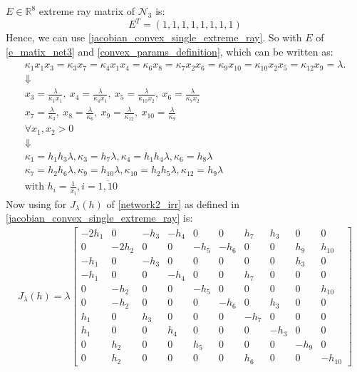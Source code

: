 $E \in \mathbb{R}^8$ extreme ray matrix of $\mathcal{N}_3$ is:
\begin{equation}\label{e_matix_net3}
	E^T=(1,1,1,1,1,1,1,1)
\end{equation}
Hence, we can use \ref{jacobian_convex_single_extreme_ray}. So with $E$ of \ref{e_matix_net3} and \ref{convex_params_definition}, which can be written as:
\begin{gather*}
	\kappa_1x_1x_3=\kappa_3x_7=\kappa_4x_1x_4=\kappa_6x_8=\kappa_7x_2x_6=\kappa_9x_{10}=\kappa_{10}x_2x_5=\kappa_{12}x_9=\lambda. \\
	\Downarrow \\
	x_{3} = \frac{\lambda}{\kappa_{1} x_{1}}, \ x_{4} = \frac{\lambda}{\kappa_{4} x_{1}}, \ x_{5} = \frac{\lambda}{\kappa_{10} x_{2}}, \ x_{6} = \frac{\lambda}{\kappa_{7} x_{2}} \\
	x_{7} = \frac{\lambda}{\kappa_{3}}, \ x_{8} = \frac{\lambda}{\kappa_{6}}, \ x_{9} = \frac{\lambda}{\kappa_{12}}, \ x_{10} = \frac{\lambda}{\kappa_{9}} \\
	\forall x_1, x_2 > 0 \\
	\Downarrow \\
	\kappa_{1} = h_{1} h_{3} \lambda, \kappa_{3} = h_{7} \lambda, \kappa_{4} = h_{1} h_{4} \lambda, \kappa_{6} = h_{8} \lambda \\
	\kappa_{7} = h_{2} h_{6} \lambda, \kappa_{9} = h_{10} \lambda, \kappa_{10} = h_{2} h_{5} \lambda, \kappa_{12} = h_{9} \lambda \\
	\text{with } h_i = \frac{1}{x_i} , i = \overline{1,10}
\end{gather*}
Now using \cite{franz2016ConvexMaple} for $J_\lambda(h)$ of \ref{network2_irr} as defined in \ref{jacobian_convex_single_extreme_ray} is:
\begin{align}
	J_\lambda(h) = \lambda
	\left.\left[
		\begin{array}{rrrrrrrrrr}-2h_{1}&0&-h_{3}&-h_{4}&0&0&h_{7}&h_{3}&0&0\\0&-2h_{2}&0&0&-h_{5}&-h_{6}&0&0&h_{9}&h_{10}\\-h_{1}&0&-h_{3}&0&0&0&0&0&h_{3}&0\\-h_{1}&0&0&-h_{4}&0&0&h_{7}&0&0&0\\0&-h_{2}&0&0&-h_{5}&0&0&0&0&h_{10}\\0&-h_{2}&0&0&0&-h_{6}&0&h_{3}&0&0\\h_{1}&0&h_{3}&0&0&0&-h_{7}&0&0&0\\h_{1}&0&0&h_{4}&0&0&0&-h_{3}&0&0\\0&h_{2}&0&0&h_{5}&0&0&0&-h_{9}&0\\0&h_{2}&0&0&0&0&h_{6}&0&0&-h_{10}
	\end{array}\right.\right]
\end{align}
